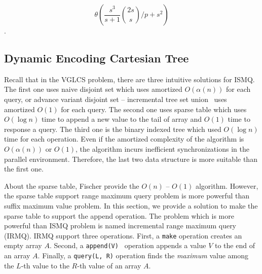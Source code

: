 \begin{equation}
\theta\left(\frac{s^3}{s+1} \binom{2s}{s} \bigg/ p + s^2 \right)
\end{equation}.
\fi



\subsection{Dynamic Encoding Cartesian Tree}

Recall that in the VGLCS problem, there are three intuitive solutions
for ISMQ.  The first one uses naive disjoint set which uses amortized
$O(\alpha(n))$ for each query, or advance variant disjoint set --
incremental tree set union~\cite{Gabow1983ALA} uses amortized $O(1)$
for each query.  The second one uses sparse table which uses $O(\log
n)$ time to append a new value to the tail of array and $O(1)$ time to
response a query.  The third one is the binary indexed tree which used
$O(\log n)$ time for each operation.  Even if the amortized complexity
of the algorithm is $O(\alpha(n))$ or $O(1)$, the algorithm incurs
inefficient synchronizations in the parallel environment. Therefore,
the last two data structure is more suitable than the first one.

About the sparse table, Fischer provide the $O(n)$ -- $O(1)$
algorithm.  However, the sparse table support range maximum query
problem is more powerful than suffix maximum value problem.  In this
section, we provide a solution to make the sparse table to support the
append operation. The problem which is more powerful than ISMQ problem
is named incremental range maximum query (IRMQ).  IRMQ support three
operations.  First, a {\tt make} operation creates an empty array $A$.
Second, a {\tt append(V) } operation appends a value $V$ to the end of
an array $A$.  Finally, a {\tt query(L, R)} operation finds the {\em
  maximum} value among the $L$-th value to the $R$-th value of an
array $A$.

\iffalse

ISMQ 已知解法有二，其一使用並查集在 $O(\alpha(n))$ 解決單一操作，其二
使用樸素的稀疏表在 $O(\log n)$完成插入操作、$O(1)$ 完成詢問操作。其二，
Fischer \cite{fischer} 提出的 $\theta(n)$ -- $\theta(1)$ 無法應用在此，
其原因在於插入元素時，無法動態決定 in-block 的最大值，必須等到整個
in-block 塞滿至預設值才可解決。

在我們的應用中維護後綴最大值，
拓展其操作成為增長區間最大值查找 (\emph{incremental range maximum query}, IRMQ)，
其支援兩項操作：
\fi

